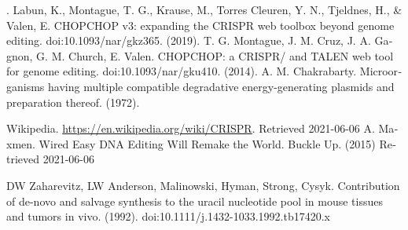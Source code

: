 \documentclass[12pt,a4paper,BCOR=.7cm,headsepline,bibliography=totoc]{report}
\begin{document}
%
%
\begin{thebibliography}{1}
\begin{latin}
. 
 {Labun, K., Montague, T. G., Krause, M., Torres Cleuren, Y. N., Tjeldnes, H., \& Valen, E. CHOPCHOP v3: expanding the CRISPR web toolbox beyond genome editing. doi:10.1093/nar/gkz365.  (2019).}
 {T. G. Montague, J. M. Cruz, J. A. Gagnon, G. M. Church, E. Valen. CHOPCHOP: a CRISPR/ and TALEN web tool for genome editing. doi:10.1093/nar/gku410.  (2014).}
 {A. M. Chakrabarty. Microorganisms having multiple compatible degradative energy-generating plasmids and preparation thereof.  (1972).}

  {Wikipedia. \href{https://en.wikipedia.org/wiki/CRISPR}{\url{https://en.wikipedia.org/wiki/CRISPR}}. Retrieved 2021-06-06}
 {A. Maxmen. Wired Easy DNA Editing Will Remake the World. Buckle Up.  (2015) Retrieved 2021-06-06}

 {DW Zaharevitz, LW Anderson, Malinowski, Hyman, Strong, Cysyk. Contribution of de-novo and salvage synthesis to the uracil nucleotide pool in mouse tissues and tumors in vivo. (1992). doi:10.1111/j.1432-1033.1992.tb17420.x}


\end{latin}
\end{thebibliography}
\end{document}
